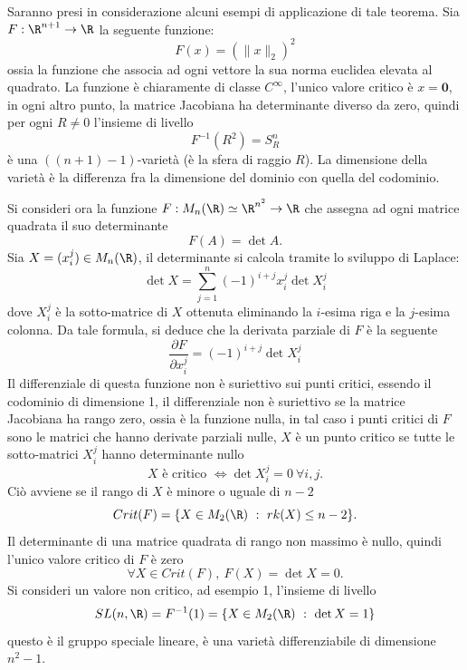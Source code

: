 \documentclass[10pt, letterpaper]{report}
\begin{document}
Saranno presi in considerazione alcuni esempi di applicazione di tale teorema. Sia $F:\R^{n+1}\rightarrow\R$ la seguente funzione:\begin{equation}
    F(x)=(\|x\|_2)^2
\end{equation}
ossia la funzione che associa ad ogni vettore la sua norma euclidea elevata al quadrato. La funzione è chiaramente di classe $C^\infty$, l'unico valore critico è $x=\mathbf 0$, in ogni altro punto, la matrice Jacobiana ha determinante diverso da zero, quindi per ogni $R\ne 0$ l'insieme di livello\begin{equation}
    F^{-1}(R^2)=S^n_R
\end{equation}
è una $((n+1)-1)$-varietà (è la sfera di raggio $R$). La dimensione della varietà è la differenza fra la dimensione del dominio con quella del codominio.\bigskip

\noindent Si consideri ora la funzione $F:M_n(\R)\simeq\R^{n^2}\rightarrow\R$ che assegna ad ogni matrice quadrata il suo determinante\begin{equation}
    F(A)=\det A.
\end{equation}
Sia $X=(x_i^j)\in M_n(\R)$, il determinante si calcola tramite lo sviluppo di Laplace:\begin{equation}
    \det X=\sum_{j=1}^n(-1)^{i+j}x_{i}^j\det X_i^j
\end{equation}
dove $X_i^j$ è la sotto-matrice di $X$ ottenuta eliminando la $i$-esima riga e la $j$-esima colonna. Da tale formula, si deduce che la derivata parziale di $F$ è la seguente\begin{equation}
    \frac{\partial F}{\partial x_i^j}=(-1)^{i+j}\det X_i^j
\end{equation}
Il differenziale di questa funzione non è suriettivo sui punti critici, essendo il codominio di dimensione 1, il differenziale non è suriettivo se la matrice Jacobiana ha rango zero, ossia è la funzione nulla, in tal caso i punti critici di $F$ sono le matrici che hanno derivate parziali nulle, $X$ è un punto critico se tutte le sotto-matrici $X_i^j$ hanno determinante nullo\begin{equation}
    X\text{ è critico }\iff \det X_i^j=0 \ \forall i,j.
\end{equation}
Ciò avviene se il rango di $X$ è minore o uguale di $n-2$\begin{equation}
    Crit(F)=\{X\in M_2(\R) \ : \ rk(X)\le n-2\}.
\end{equation}
Il determinante di una matrice quadrata di rango non massimo è nullo, quindi l'unico valore critico di $F$ è zero\begin{equation}
    \forall X\in Crit(F), \ F(X)=\det X=0.
\end{equation}
Si consideri un valore non critico, ad esempio 1, l'insieme di livello\begin{equation}
    SL(n,\R)=F^{-1}(1)=\{X\in M_2(\R) \ : \ \det X=1\}
\end{equation}
questo è il gruppo speciale lineare, è una varietà differenziabile di dimensione $n^2-1$.\bigskip
\end{document}
